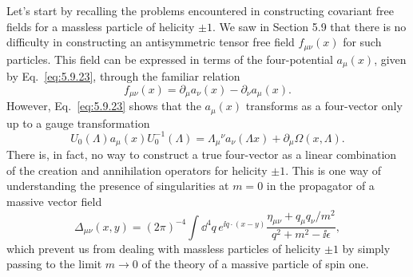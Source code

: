 Let's start by recalling the problems encountered in constructing covariant
free fields for a massless particle of helicity $\pm1$. We saw in Section 5.9
that there is no difficulty in constructing an antisymmetric tensor free
field $f_{\mu\nu}(x)$ for such particles. This field can be expressed in terms of the
four-potential $a_\mu(x)$, given by Eq.~\eqref{eq:5.9.23}, through the familiar relation
\begin{equation}
  f_{\mu\nu}(x)=\partial_\mu a_\nu(x)-\partial_\nu a_\mu(x).
  \tag{8.1.1}\label{eq:8.1.1}
\end{equation}
However, Eq.~\eqref{eq:5.9.23} shows that the $a_\mu(x)$ transforms as a four-vector
only up to a gauge transformation
\begin{equation}
  U_0(\Lambda)a_\mu(x)U_0^{-1}(\Lambda)
  =\Lambda_\mu{}^\nu a_\nu(\Lambda x)+\partial_\mu\Omega(x,\Lambda).
  \tag{8.1.2}\label{eq:8.1.2}
\end{equation}
There is, in fact, no way to construct a true four-vector as a linear
combination of the creation and annihilation operators for helicity $\pm1$.
This is one way of understanding the presence of singularities at $m=0$ in
the propagator of a massive vector field
\[
  \Delta_{\mu\nu}(x,y)=(2\pi)^{-4}\int \dd^4q\,e^{\ii q\cdot(x-y)}
  \frac{\eta_{\mu\nu}+q_\mu q_\nu/m^2}{q^2+m^2-\ii\epsilon},
\]
which prevent us from dealing with massless particles of helicity $\pm1$ by
simply passing to the limit $m\to0$ of the theory of a massive particle of
spin one.

